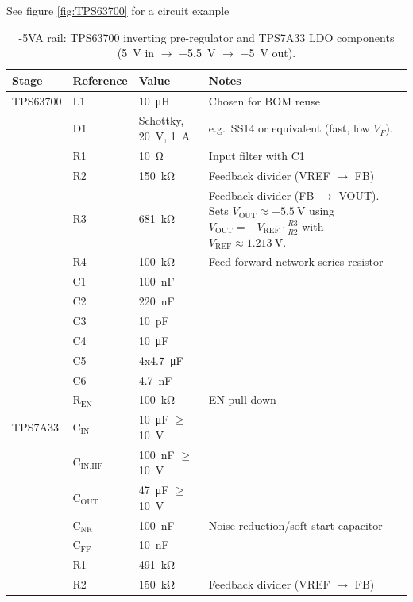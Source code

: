 \documentclass[11pt]{article}
\begin{document}
\begin{table}[!htbp]
\centering
\caption{-5VA rail: TPS63700 inverting pre-regulator and TPS7A33 LDO components
(\SI{5}{\volt} in $\rightarrow$ \SI{-5.5}{\volt} $\rightarrow$ \SI{-5}{\volt} out).} See figure \ref{fig:TPS63700} 
for a circuit exanple
\label{tab:-5va-bom}
\begin{tabular}{l l l p{7.2cm}}
\toprule
\textbf{Stage} & \textbf{Reference} & \textbf{Value} & \textbf{Notes} \\
\midrule
TPS63700
& L1   & \SI{10}{\micro\henry}
& Chosen for BOM reuse\\
& D1   & Schottky, \SI{20}{\volt}, \SI{1}{\ampere}
& e.g.\ SS14 or equivalent (fast, low \(V_F\)). \\
& R1   & \SI{10}{\ohm}
& Input filter with C1\\
& R2   & \SI{150}{\kilo\ohm}
& Feedback divider (VREF $\rightarrow$ FB)\\
& R3   & \SI{681}{\kilo\ohm}
& Feedback divider (FB $\rightarrow$ VOUT). Sets \(V_\text{OUT}\approx\SI{-5.5}{\volt}\) using
\(V_{\text{OUT}} = -V_{\text{REF}}\cdot\frac{R3}{R2}\) with \(V_\text{REF}\approx\SI{1.213}{\volt}\). \\
& R4   & \SI{100}{\kilo\ohm}
& Feed-forward network series resistor \\
& C1   & \SI{100}{\nano\farad}
&  \\
& C2   & \SI{220}{\nano\farad}
& \\
& C3   & \SI{10}{\pico\farad}
& \\
& C4   & \SI{10}{\micro\farad}
& \\
& C5   & 4x\SI{4.7}{\micro\farad}
& \\
& C6   & \SI{4.7}{\nano\farad}
& \\
& R\(_\text{EN}\)    & \SI{100}{\kilo\ohm}
& EN pull-down \\
\midrule
TPS7A33
& C\(_\text{IN}\)    & \SI{10}{\micro\farad} \(\ge\)\SI{10}{\volt}
& \\
& C\(_\text{IN,HF}\) & \SI{100}{\nano\farad} \(\ge\)\SI{10}{\volt}
& \\
& C\(_\text{OUT}\)   & \SI{47}{\micro\farad} \(\ge\)\SI{10}{\volt}
&  \\
& C\(_\text{NR}\)    & \SI{100}{\nano\farad}
& Noise-reduction/soft-start capacitor\\
& C\(_\text{FF}\)   & \SI{10}{\nano\farad}
& \\
& R1   & \SI{491}{\kilo\ohm}
& \\
& R2   & \SI{150}{\kilo\ohm}
& Feedback divider (VREF $\rightarrow$ FB)\\
\bottomrule
\end{tabular}
\end{table}
\end{document}
